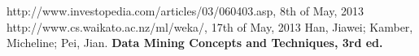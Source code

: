 \begin{thebibliography}{9}
\label{Biblio}
 http://www.investopedia.com/articles/03/060403.asp, 8th of May, 2013
 http://www.cs.waikato.ac.nz/ml/weka/, 17th of May, 2013
 Han, Jiawei; Kamber, Micheline; Pei, Jian. \textbf{Data Mining Concepts and Techniques, 3rd ed.}
\end{thebibliography}